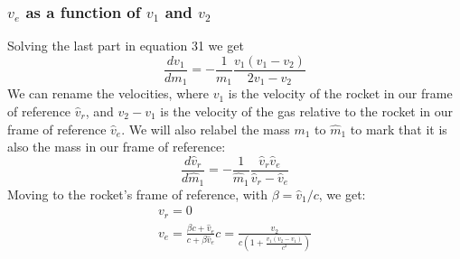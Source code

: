 \documentclass{article}
\begin{document}
\subsubsection{$v_e$ as a function of $v_1$ and $v_2$}
Solving the last part in equation 31 we get
\begin{equation}
    \frac{dv_1}{dm_1} = -\frac{1}{m_1} \frac{v_1(v_1 - v_2)}{2v_1 - v_2}
\end{equation}
We can rename the velocities, where $v_1$ is the velocity of the rocket in our frame of reference $\hat{v}_r$, and $v_2 - v_1$ is the velocity of the gas relative to the rocket in our frame of reference $\hat{v}_e$. We will also relabel the mass $m_1$ to $\hat{m}_1$ to mark that it is also the mass in our frame of reference:
\begin{equation}
    \frac{d\hat{v}_r}{d\hat{m}_1} = -\frac{1}{\hat{m}_1} \frac{\hat{v}_r\hat{v}_e}{\hat{v}_r - \hat{v}_e}
\end{equation}
Moving to the rocket's frame of reference, with $\beta = \hat{v}_1 / c$, we get:
\begin{equation}
\begin{gathered}
    v_r = 0 \\
    v_e = \frac{\beta c + \hat{v}_e}{c + \beta\hat{v}_e}c = \frac{v_2}{c\left(1+\frac{v_1 (v_2 - v_1)}{c^2}\right)}
\end{gathered}
\end{equation}
\end{document}
